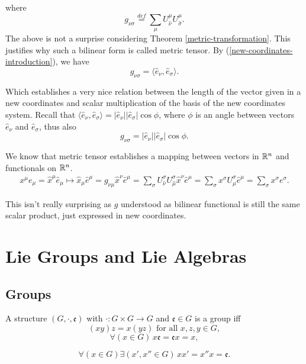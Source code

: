 \documentclass[main.tex]{subfiles}
\begin{document}
where
\begin{equation}
g_{\nu\sigma} \stackrel{def}{=} \sum_{\mu} U^\mu_{\hat{\nu}} U^\mu_{\hat{\sigma}}. 
\end{equation}
The above is not a surprise considering Theorem \ref{metric-transformation}. This justifies why such a bilinear form is called metric tensor.
By (\ref{new-coordinates-introduction}), we have
\begin{equation}
g_{\nu\sigma} = \langle \hat{e}_\nu, \hat{e}_\sigma \rangle. 
\end{equation}

Which establishes a very nice relation between the length of the vector given in a new coordinates and scalar multiplication of the basis of the new coordinates system. Recall that $\langle \hat{e}_\nu, \hat{e}_\sigma \rangle = |\hat{e}_\nu||\hat{e}_\sigma| \cos\phi$, where $\phi$ is an angle between vectors $\hat{e}_\nu$ and $\hat{e}_\sigma$,
thus also
\begin{equation}
g_{\nu\sigma} = |\hat{e}_\nu||\hat{e}_\sigma| \cos\phi.
\end{equation}

We know that metric tensor establishes a mapping between vectors in $\mathbb{R}^n$ and functionals on $\mathbb{R}^n$.
\begin{align*}
x^\mu e_\mu = \hat{x}^\mu \hat{e}_\mu \mapsto \hat{x}_\mu \hat{e}^\mu = g_{\nu\mu} \hat{x}^\nu \hat{e}^\mu = \sum_{\sigma} U^\sigma_{\hat{\nu}} U^\sigma_{\hat{\mu}} \hat{x}^\nu \hat{e}^\mu
= \sum_{\sigma} x^\sigma U^\sigma_{\hat{\mu}} \hat{e}^\mu = \sum_{\sigma} x^\sigma e^\sigma.
\end{align*}

This isn't really surprising as $g$ understood as bilinear functional is still the same scalar product, just expressed in new coordinates.

\section{Lie Groups and Lie Algebras}

\subsection{Groups}

\begin{definition}
\label{group-definition}
A structure $(G, \cdot, \mathfrak{e})$ with $\cdot : G\times G\to G$ and $\mathfrak{e}\in G$ is a group iff
\begin{equation}
(xy)z = x(yz) \text{ for all } x,z,y\in G,
\end{equation}
\begin{equation}
\forall (x\in G) \, x\mathfrak{e} = \mathfrak{e} x = x, 
\end{equation}

\begin{equation}
\label{group-inverse-axiom}
\forall (x\in G)\exists(x', x'' \in G)\, xx' = x''x = \mathfrak{e}. 
\end{equation}
\end{definition}
\end{document}
